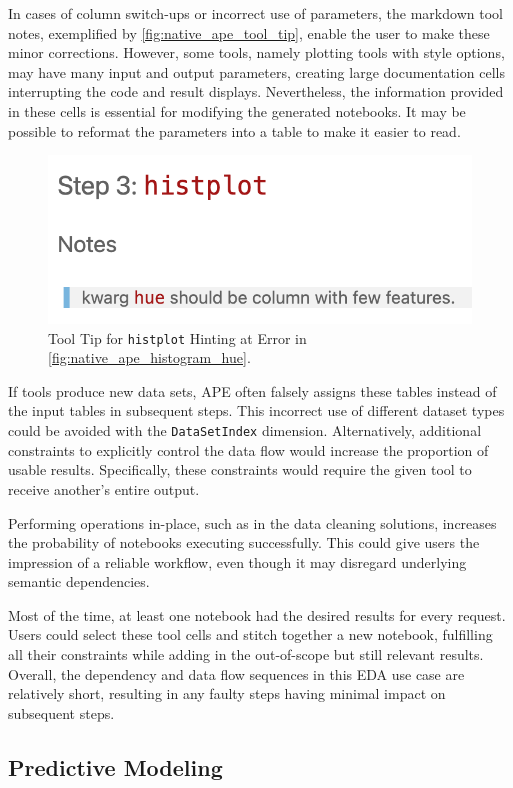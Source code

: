 In cases of column switch-ups or incorrect use of parameters, the markdown tool notes, exemplified by \autoref{fig:native_ape_tool_tip}, enable the user to make these minor corrections. However, some tools, namely plotting tools with style options, may have many input and output parameters, creating large documentation cells interrupting the code and result displays. Nevertheless, the information provided in these cells is essential for modifying the generated notebooks. It may be possible to reformat the parameters into a table to make it easier to read.

\begin{figure}[h]
    \centering
    \includegraphics[width=0.5\linewidth]{Tex//images//native_ape_eval//tool_tip_hue.png}
    \caption{Tool Tip for \texttt{histplot} Hinting at Error in \autoref{fig:native_ape_histogram_hue}.}
    \label{fig:native_ape_tool_tip}
\end{figure}

If tools produce new data sets, APE often falsely assigns these tables instead of the input tables in subsequent steps. This incorrect use of different dataset types could be avoided with the \verb|DataSetIndex| dimension. Alternatively, additional constraints to explicitly control the data flow would increase the proportion of usable results. Specifically, these constraints would require the given tool to receive another's entire output.

Performing operations in-place, such as in the data cleaning solutions, increases the probability of notebooks executing successfully. This could give users the impression of a reliable workflow, even though it may disregard underlying semantic dependencies.

Most of the time, at least one notebook had the desired results for every request. Users could select these tool cells and stitch together a new notebook, fulfilling all their constraints while adding in the out-of-scope but still relevant results. Overall, the dependency and data flow sequences in this EDA use case are relatively short, resulting in any faulty steps having minimal impact on subsequent steps.

\subsection{Predictive Modeling}


